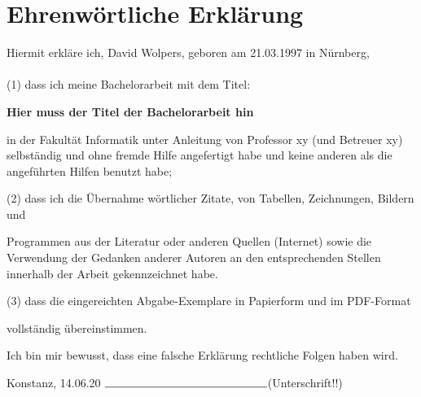 \chapter*{Ehrenwörtliche Erklärung}

Hiermit erkläre ich, David Wolpers, geboren am 21.03.1997 in Nürnberg, \\
\\
(1)	dass ich meine Bachelorarbeit mit dem Titel:\\
\begin{center}
\textbf{Hier muss der Titel der Bachelorarbeit hin}
\end{center}
\begin{addmargin}[1.5em]{0em}
\begin{flushleft}
in der Fakultät Informatik unter Anleitung von Professor xy (und Betreuer xy)  selbständig und ohne fremde Hilfe angefertigt habe und keine anderen als die angeführten Hilfen benutzt habe;
\end{flushleft}
\end{addmargin}

\begin{flushleft}
(2)	dass ich die Übernahme wörtlicher Zitate, von Tabellen, Zeichnungen, Bildern und 
\begin{addmargin}[1.5em]{0em}
Programmen aus der Literatur oder anderen Quellen (Internet) sowie die Verwendung der Gedanken anderer Autoren an den entsprechenden Stellen innerhalb der Arbeit gekennzeichnet habe.
\end{addmargin}
\end{flushleft}
\begin{flushleft}
(3)	dass die eingereichten Abgabe-Exemplare in Papierform und im PDF-Format 
\begin{addmargin}[1.5em]{0em}
vollständig übereinstimmen.
\end{addmargin}
\end{flushleft}
\begin{addmargin}[0.5em]{0em}
Ich bin mir bewusst, dass eine falsche Erklärung rechtliche Folgen haben wird.
\end{addmargin}
\vspace{\baselineskip}


Konstanz, 14.06.20	 \hspace{3cm} $\rule{5cm}{0.15mm}$(Unterschrift!!)
